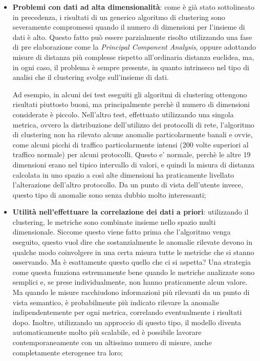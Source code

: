 \documentclass[12pt,a4paper,cucitura]{toptesi}
\begin{document}
\begin{itemize}
\item \textbf{Problemi con dati ad alta dimensionalità}: come è già stato sottolineato in precedenza, i risultati di un generico algoritmo di clustering sono severamente compromessi quando il numero di dimensioni per l'insieme di dati è alto.
Questo fatto può essere parzialmente risolto utilizzando una fase di pre elaborazione come la \emph{Principal Component Analysis}, oppure adottando misure di distanza più complesse rispetto all'ordinaria distanza euclidea, ma, in ogni caso, il problema è sempre presente, in quanto intrinseco nel tipo di analisi che il clustering svolge sull'insieme di dati.

Ad esempio, in alcuni dei test eseguiti gli algoritmi di clustering ottengono risultati piuttosto buoni, ma principalmente perchè il numero di dimensioni considerate è piccolo.
Nell'altro test, effettuato utilizzando una singola metrica, ovvero la distribuzione dell'utilizzo dei protocolli di rete, l'algoritmo di clustering non ha rilevato alcune anomalie particolarmente banali e ovvie, come alcuni picchi di traffico particolarmente intensi (200 volte superiori al traffico normale) per alcuni protocolli. Questo e' normale, perchè le altre 19 dimensioni erano nel tipico intervallo di valori, e quindi la misura di distanza calcolata in uno spazio a così alte dimensioni ha praticamente livellato l'alterazione dell'altro protocollo.
Da un punto di vista dell'utente invece, questo tipo di anomalie sono senza dubbio molto interessanti;
\item \textbf{Utilità nell'effettuare la correlazione dei dati a priori}: utilizzando il clustering, le metriche sono combinate insieme nello spazio multi dimensionale. Siccome questo viene fatto prima che l'algoritmo venga eseguito, questo vuol dire che sostanzialmente le anomalie rilevate devono in qualche modo coinvolgere in una certa misura tutte le metriche che si stanno osservando.
Ma è esattamente questo quello che ci si aspetta?
Una strategia come questa funziona estremamente bene quando le metriche analizzate sono semplici e, se prese individualmente, non hanno praticamente alcun valore.
Ma quando le misure racchiudono informazioni più rilevanti da un punto di vista semantico, è probabilmente più indicato rilevare la anomalie indipendentemente per ogni metrica, correlando eventualmente i risultati dopo.
Inoltre, utilizzando un approccio di questo tipo, il modello diventa automaticamente molto più scalabile, ed è possibile lavorare contemporaneamente con un altissimo numero di misure, anche completamente eterogenee tra loro;

\end{itemize}
\end{document}
